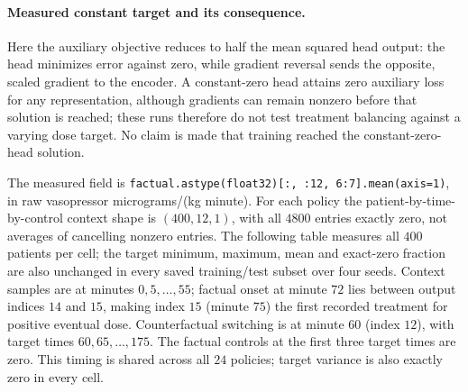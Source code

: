 \paragraph{Measured constant target and its consequence.}\label{app:crnzerotarget}
Here the auxiliary objective reduces to half the mean squared head output: the head minimizes error against zero, while gradient reversal sends the opposite, scaled gradient to the encoder. A constant-zero head attains zero auxiliary loss for any representation, although gradients can remain nonzero before that solution is reached; these runs therefore do not test treatment balancing against a varying dose target. No claim is made that training reached the constant-zero-head solution.

The measured field is \texttt{factual.astype(float32)[:, :12, 6:7].mean(axis=1)}, in raw vasopressor micrograms/(kg minute). For each policy the patient-by-time-by-control context shape is $(400,12,1)$, with all $4800$ entries exactly zero, not averages of cancelling nonzero entries. The following table measures all $400$ patients per cell; the target minimum, maximum, mean and exact-zero fraction are also unchanged in every saved training/test subset over four seeds. Context samples are at minutes $0,5,\ldots,55$; factual onset at minute $72$ lies between output indices $14$ and $15$, making index $15$ (minute $75$) the first recorded treatment for positive eventual dose. Counterfactual switching is at minute $60$ (index $12$), with target times $60,65,\ldots,175$. The factual controls at the first three target times are zero. This timing is shared across all $24$ policies; target variance is also exactly zero in every cell.

